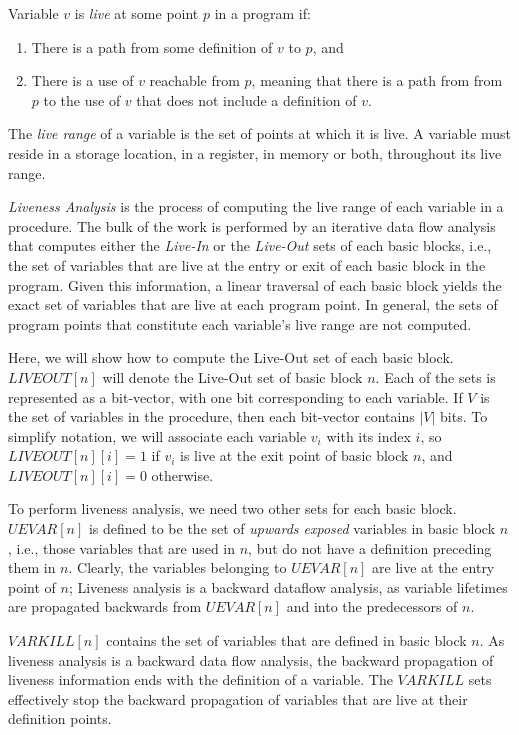 Variable $v$ is \emph{live} at some point $p$ in a program if:
\begin{enumerate}
\item There is a path from some definition of $v$ to $p$, and
\item There is a use of $v$ reachable from $p$, meaning that
there is a path from from $p$ to the use of $v$ that does not
include a definition of $v$. 
\end{enumerate}

The \emph{live range} of a variable is the set of points
at which it is live. A variable must reside in a storage 
location, in a register, in memory or both, throughout
its live range.  

\emph{Liveness Analysis} is the process of computing the
live range of each variable in a procedure. The bulk of
the work is performed by an iterative data flow analysis
that computes either the \emph{Live-In} or the 
\emph{Live-Out} sets of each basic blocks, i.e., the set
of variables that are live at the entry or exit of
each basic block in the program. Given this information,
a linear traversal of each basic block yields the 
exact set of variables that are live at each program
point. In general, the sets of program points that
constitute each variable's live range are not computed.

Here, we will show how to compute the Live-Out set of
each basic block. $LIVEOUT[n]$ will denote the Live-Out
set of basic block $n$. Each of the sets is represented
as a bit-vector, with one bit corresponding to each
variable. If $V$ is the set of variables in the procedure,
then each bit-vector contains $|V|$ bits. To simplify
notation, we will associate each variable $v_{i}$ with
its index $i$, so $LIVEOUT[n][i] = 1$ if $v_{i}$ is live
at the exit point of basic block $n$, and 
$LIVEOUT[n][i] = 0$ otherwise. 

To perform liveness analysis, we need two other sets for
each basic block. $UEVAR[n]$ is defined to be the set of
\emph{upwards exposed} variables in basic block $n$, i.e.,
those variables that are used in $n$, but do not have a 
definition preceding them in $n$. Clearly, the variables
belonging to $UEVAR[n]$ are live at the entry point of $n$;
Liveness analysis is a backward dataflow analysis, as
variable lifetimes are propagated backwards from
$UEVAR[n]$ and into the predecessors of $n$. 

$VARKILL[n]$ contains the set of variables that are defined
in basic block $n$. As liveness analysis is a backward
data flow analysis, the backward propagation of liveness
information ends with the definition of a variable. 
The $VARKILL$ sets effectively stop the backward 
propagation of variables that are live at their definition
points.

